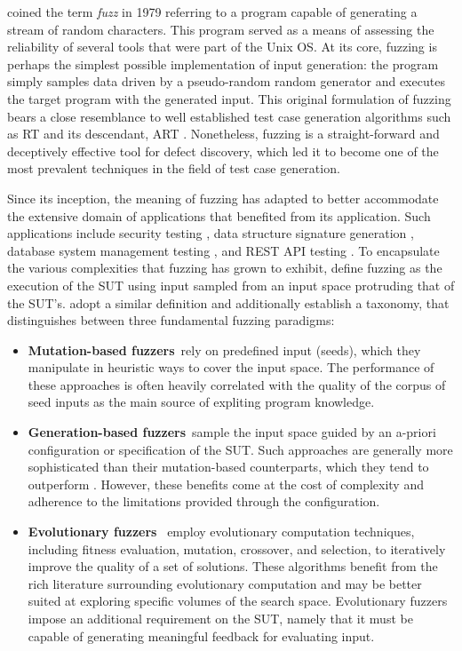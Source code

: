 \citet{miller1990empirical} coined the term \textit{fuzz} in 1979 referring
to a program capable of generating a stream of random characters.
This program served as a means of assessing
the reliability of several tools that were part of the Unix \Gls{OS}.
At its core, fuzzing is perhaps the simplest possible implementation
of input generation: the program simply samples data
driven by a pseudo-random random generator and executes
the target program with the generated input.
This original formulation of fuzzing bears a close
resemblance to well established test case generation algorithms
such as \Gls{RT} \cite{duran1981report} and 
its descendant, \Gls{ART} \cite{chen2010adaptive}.
Nonetheless, fuzzing is a straight-forward and deceptively effective 
tool for defect discovery, which led it to become one
of the most prevalent techniques in the field of test case generation.

Since its inception, the meaning of fuzzing has adapted to
better accommodate the extensive domain of applications that
benefited from its application.
Such applications include security testing \cite{oehlert2005violating, stephens2016driller},
data structure signature generation \cite{dolan2009robust}, 
database system management testing \cite{zhong2020squirrel},
and REST API testing \cite{atlidakis2019restler, godefroid2020intelligent}.
To encapsulate the various complexities that fuzzing has grown
to exhibit, \citet{manes2019art} define fuzzing as the execution
of the \gls{SUT} using input sampled from an input space protruding
that of the \gls{SUT}'s.
\citet{saavedra2019review} adopt a similar definition and additionally
establish a taxonomy, that distinguishes between three 
fundamental fuzzing paradigms:

\begin{itemize}
\item \textbf{Mutation-based fuzzers}~rely on predefined input (seeds),
which they manipulate in heuristic ways to cover the input space.
The performance of these approaches is often heavily correlated
with the quality of the corpus of seed inputs as the main source
of expliting program knowledge.


\item \textbf{Generation-based fuzzers}~sample the input space
guided by an a-priori configuration or specification of the \gls{SUT}.
Such approaches are generally more sophisticated than their mutation-based
counterparts, which they tend to outperform \cite{saavedra2019review}.
However, these benefits come at the cost of complexity and
adherence to the limitations provided through the configuration.

\item \textbf{Evolutionary fuzzers}~ employ evolutionary computation
techniques, including fitness evaluation, mutation, crossover, and selection,
to iteratively improve the quality of a set of solutions.
These algorithms benefit from the rich literature surrounding
evolutionary computation and may be better suited at exploring
specific volumes of the search space.
Evolutionary fuzzers impose an additional requirement on the \gls{SUT},
namely that it must be capable of generating meaningful
feedback for evaluating input.
\end{itemize}

